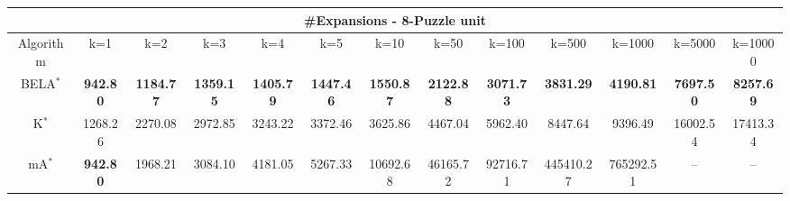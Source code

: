 \begin{tabular}{c|cccccccccccc}\toprule
\multicolumn{13}{c}{#Expansions - 8-Puzzle unit}\\ \midrule
Algorithm & k=1 & k=2 & k=3 & k=4 & k=5 & k=10 & k=50 & k=100 & k=500 & k=1000 & k=5000 & k=10000 \\ \midrule
BELA$^*$ & \textbf{942.80} & \textbf{1184.77} & \textbf{1359.15} & \textbf{1405.79} & \textbf{1447.46} & \textbf{1550.87} & \textbf{2122.88} & \textbf{3071.73} & \textbf{3831.29} & \textbf{4190.81} & \textbf{7697.50} & \textbf{8257.69} \\
K$^*$ & 1268.26 & 2270.08 & 2972.85 & 3243.22 & 3372.46 & 3625.86 & 4467.04 & 5962.40 & 8447.64 & 9396.49 & 16002.54 & 17413.34 \\
mA$^*$ & \textbf{942.80} & 1968.21 & 3084.10 & 4181.05 & 5267.33 & 10692.68 & 46165.72 & 92716.71 & 445410.27 & 765292.51 & -- & -- \\ \bottomrule 
\end{tabular}

